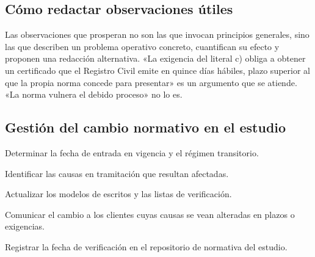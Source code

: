 \subsection{Cómo redactar observaciones útiles}

\begin{practica}
Las observaciones que prosperan no son las que invocan principios generales, sino las que
describen un problema operativo concreto, cuantifican su efecto y proponen una redacción
alternativa. «La exigencia del literal c) obliga a obtener un certificado que el Registro
Civil emite en quince días hábiles, plazo superior al que la propia norma concede para
presentar» es un argumento que se atiende. «La norma vulnera el debido proceso» no lo es.
\end{practica}

\subsection{Gestión del cambio normativo en el estudio}

\begin{checklist}
  \item Determinar la fecha de entrada en vigencia y el régimen transitorio.
  \item Identificar las causas en tramitación que resultan afectadas.
  \item Actualizar los modelos de escritos y las listas de verificación.
  \item Comunicar el cambio a los clientes cuyas causas se vean alteradas en plazos o
  exigencias.
  \item Registrar la fecha de verificación en el repositorio de normativa del estudio.
\end{checklist}
